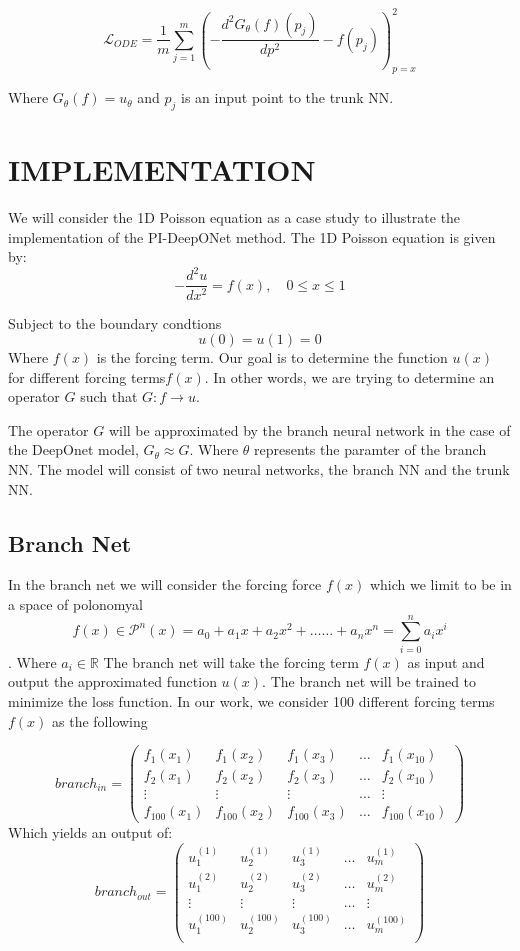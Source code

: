 \documentclass[a4paper, onecolumn, 12pt]{article}
\begin{document}
    $$
    \mathcal{L}_{ODE} = \frac{1}{m} \sum_{j=1}^{m}
    \left(
    -\frac{d^2 G_{\theta}(f)(p_j)}{dp^2} - f(p_j)
    \right)^2_{p=x}
    $$


    Where $G_{\theta}(f)=u_{\theta}$ and $p_j$ is an input point to the trunk NN.
\section*{IMPLEMENTATION}
We will consider the 1D Poisson equation as a case study to 
illustrate the implementation of the PI-DeepONet method. The 1D Poisson equation is given by:
$$
-\frac{d^2 u}{d x^2} = f(x), \quad 0 \le x \le 1
$$

Subject to the boundary condtions
$$
u(0) = u(1) = 0
$$
Where $f(x)$ is the forcing term. Our goal is to determine the function $u(x)$ for different
 forcing terms$f(x)$. In other words, we are trying to determine an
  operator $G$ such that $G:f \rightarrow u$.

The operator $G$ will be approximated by the branch neural network in the case of
 the DeepOnet model, $G_{\theta} \approx G$. Where $\theta$ represents the paramter 
 of the branch NN.
The model will consist of two neural networks, the branch NN and the trunk NN. 
\subsection*{Branch Net}
In the branch net we will consider the forcing force $f(x)$ which we limit to be in a space of polonomyal
$$f(x) \in \mathcal{P}^n(x) =   a_0 + a_1 x + a_2 x^2 + \dots \dots + a_n x^n = \sum_{i=0}^{n} a_i x^i$$. 
 Where $a_i \in \mathbb{R}$ The branch net will take the forcing term $f(x)$ as input and output the approximated function $u(x)$.
  The branch net will be trained to minimize the loss function. In our work, we consider 100 different forcing terms $f(x)$ as the following 
  
$$
branch_{in} =
\begin{pmatrix}
f_1(x_1) & f_1(x_2) & f_1(x_3) & \dots & f_1(x_{10})\\
f_2(x_1) & f_2(x_2) & f_2(x_3) & \dots & f_2(x_{10})\\
\vdots & \vdots & \vdots & \dots & \vdots\\
f_{100}(x_1) & f_{100}(x_2) & f_{100}(x_3) & \dots & f_{100}(x_{10})
\end{pmatrix}
$$
Which yields an output of: 
$$
branch_{out} = \begin{pmatrix}
u^{(1)}_1 & u^{(1)}_2 & u^{(1)}_3 & \dots & u^{(1)}_m\\
u^{(2)}_1 & u^{(2)}_2 & u^{(2)}_3 & \dots & u^{(2)}_m\\
\vdots & \vdots & \vdots & \dots & \vdots\\
u^{(100)}_1 & u^{(100)}_2 & u^{(100)}_3 & \dots & u^{(100)}_m\\
\end{pmatrix}
$$
\end{document}
